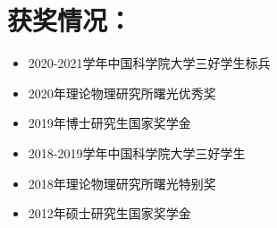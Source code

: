 \section*{获奖情况：}
\begin{itemize}
    \item 2020-2021学年中国科学院大学三好学生标兵
    
    \item 2020年理论物理研究所曙光优秀奖
    
    \item 2019年博士研究生国家奖学金
    
    \item 2018-2019学年中国科学院大学三好学生
    
    \item 2018年理论物理研究所曙光特别奖
    
    \item 2012年硕士研究生国家奖学金
    
\end{itemize}



\thispagestyle{noheaderstyle}%



\cleardoublepage[plain]%
